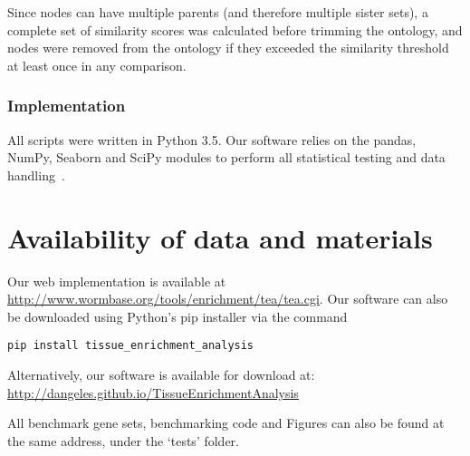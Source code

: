 \documentclass{bmcart}
\begin{document}
Since nodes can have multiple parents (and therefore multiple sister sets), a complete set of similarity scores was calculated before trimming the ontology, and nodes were removed from the ontology if they exceeded the similarity threshold at least once in any comparison. 

\subsubsection*{Implementation}
All scripts were written in Python 3.5. Our software relies on the pandas, NumPy, Seaborn and SciPy modules to perform all statistical testing and data handling~\cite{McKinney2011, VanDerWalt2011, Oliphant2007}.


\section*{Availability of data and materials}
Our web implementation is available at \url{http://www.wormbase.org/tools/enrichment/tea/tea.cgi}. Our software can also be downloaded using Python's pip installer via the command

\texttt{pip install tissue\_enrichment\_analysis}

Alternatively, our software is available for download at: \url{http://dangeles.github.io/TissueEnrichmentAnalysis}

All benchmark gene sets, benchmarking code and Figures can also be found at the same address, under the `tests' folder.
\end{document}
